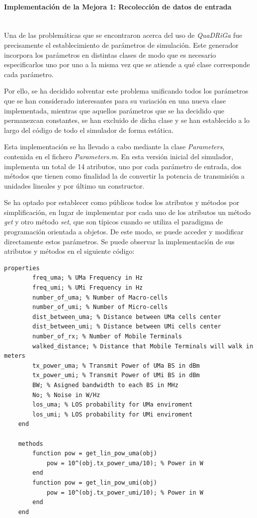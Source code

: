 \paragraph{Implementación de la Mejora 1: Recolección de datos de entrada} \mbox{} \\

Una de las problemáticas que se encontraron acerca del uso de \textit{QuaDRiGa} fue precisamente el establecimiento de parámetros de simulación. Este generador incorpora los parámetros en distintas clases de modo que es necesario especificarlos uno por uno a la misma vez que se atiende a qué clase corresponde cada parámetro.

Por ello, se ha decidido solventar este problema unificando todos los parámetros que se han considerado interesantes para su variación en una nueva clase implementada, mientras que aquellos parámetros que se ha decidido que permanezcan constantes, se han excluido de dicha clase y se han establecido a lo largo del código de todo el simulador de forma estática.

Esta implementación se ha llevado a cabo mediante la clase \textit{Parameters}, contenida en el fichero \textit{Parameters.m}. En esta versión inicial del simulador, implementa un total de 14 atributos, uno por cada parámetro de entrada, dos métodos que tienen como finalidad la de convertir la potencia de transmisión a unidades lineales y por último un constructor.

Se ha optado por establecer como públicos todos los atributos y métodos por simplificación, en lugar de implementar por cada uno de los atributos un método \textit{get} y otro método \textit{set}, que son típicos cuando se utiliza el paradigma de programación orientada a objetos. De este modo, se puede acceder y modificar directamente estos parámetros. Se puede observar la implementación de sus atributos y métodos en el siguiente código:

\begin{lstlisting}[style=Matlab-editor, basicstyle=\tiny]
    properties
        freq_uma; % UMa Frequency in Hz
        freq_umi; % UMi Frequency in Hz
        number_of_uma; % Number of Macro-cells
        number_of_umi; % Number of Micro-cells
        dist_between_uma; % Distance between UMa cells center
        dist_between_umi; % Distance between UMi cells center
        number_of_rx; % Number of Mobile Terminals
        walked_distance; % Distance that Mobile Terminals will walk in meters
        tx_power_uma; % Transmit Power of UMa BS in dBm
        tx_power_umi; % Transmit Power of UMi BS in dBm 
        BW; % Asigned bandwidth to each BS in MHz
        No; % Noise in W/Hz
        los_uma; % LOS probability for UMa enviroment
        los_umi; % LOS probability for UMi enviroment
    end
    
    methods
        function pow = get_lin_pow_uma(obj)
            pow = 10^(obj.tx_power_uma/10); % Power in W
        end
        function pow = get_lin_pow_umi(obj)
            pow = 10^(obj.tx_power_umi/10); % Power in W
        end
    end
\end{lstlisting}

